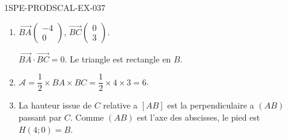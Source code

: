 \begin{corrige}{1SPE-PRODSCAL-EX-037}
\begin{enumerate}
\item $\overrightarrow{BA}\begin{pmatrix} -4 \\ 0 \end{pmatrix}$, $\overrightarrow{BC}\begin{pmatrix} 0 \\ 3 \end{pmatrix}$.

$\overrightarrow{BA} \cdot \overrightarrow{BC} = 0$. Le triangle est rectangle en $B$.

\item $\mathcal{A} = \dfrac{1}{2} \times BA \times BC = \dfrac{1}{2} \times 4 \times 3 = 6$.

\item La hauteur issue de $C$ relative a $[AB]$ est la perpendiculaire a $(AB)$ passant par $C$. Comme $(AB)$ est l'axe des abscisses, le pied est $H(4; 0) = B$.
\end{enumerate}
\end{corrige}
